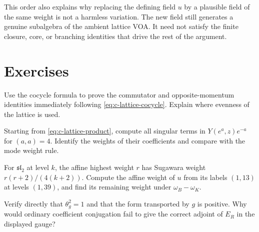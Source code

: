 This order also explains why replacing the defining field $u$ by a
plausible field of the same weight is not a harmless variation.
The new field still generates a genuine subalgebra of the ambient
lattice VOA. It need not satisfy the finite closure, core, or
branching identities that drive the rest of the argument.

\section{Exercises}

\begin{exercise}\label{ex:c-lattice-1}
Use the cocycle formula to prove the commutator and opposite-momentum
identities immediately following \eqref{eq:c-lattice-cocycle}. Explain
where evenness of the lattice is used.

\par\smallskip{}\par
\end{exercise}
\begin{exercise}\label{ex:c-lattice-2}
Starting from \eqref{eq:c-lattice-product}, compute all singular terms
in $Y(e^a,z)e^{-a}$ for $(a,a)=4$. Identify the weights of their
coefficients and compare with the mode weight rule.

\par\smallskip{}\par
\end{exercise}
\begin{exercise}\label{ex:c-lattice-3}
For $\mathfrak{sl}_2$ at level $k$, the affine highest weight $r$ has
Sugawara weight $r(r+2)/(4(k+2))$. Compute the affine weight of $u$
from its labels $(1,13)$ at levels $(1,39)$, and find its remaining
weight under $\omega_B-\omega_K$.

\par\smallskip{}\par
\end{exercise}
\begin{exercise}\label{ex:c-lattice-4}
Verify directly that $\theta_g^2=1$ and that the form transported by
$g$ is positive. Why would ordinary coefficient conjugation fail to
give the correct adjoint of $E_R$ in the displayed gauge?

\par\smallskip{}\par
\end{exercise}
